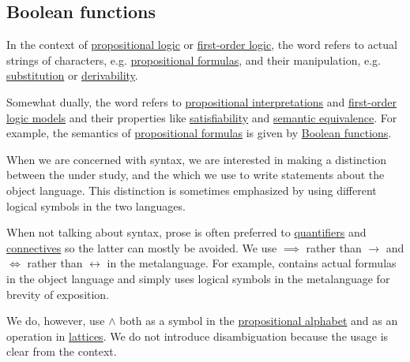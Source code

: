 \subsection{Boolean functions}\label{subsec:boolean_functions}

\begin{remark}\label{rem:metalanguage_syntax_and_semantics}
  In the context of \hyperref[subsec:propositional_logic]{propositional logic} or \hyperref[subsec:first_order_logic]{first-order logic}, the word  refers to actual strings of characters, e.g. \hyperref[def:propositional_syntax]{propositional formulas}, and their manipulation, e.g. \hyperref[def:propositional_substitution]{substitution} or \hyperref[def:first_order_proofs/derivability]{derivability}.

  Somewhat dually, the word  refers to \hyperref[def:propositional_valuation/interpretation]{propositional interpretations} and \hyperref[def:first_order_semantics/satisfiability]{first-order logic models} and their properties like \hyperref[def:propositional_semantics/satisfiability]{satisfiability} and \hyperref[def:propositional_semantics/equivalence]{semantic equivalence}. For example, the semantics of \hyperref[def:propositional_syntax]{propositional formulas} is given by \hyperref[def:boolean_function]{Boolean functions}.

  When we are concerned with syntax, we are interested in making a distinction between the  under study, and the  which we use to write statements about the object language. This distinction is sometimes emphasized by using different logical symbols in the two languages.

  When not talking about syntax, prose is often preferred to \hyperref[def:first_order_language/quantifiers]{quantifiers} and \hyperref[def:propositional_language/connectives]{connectives} so the latter can mostly be avoided. We use \( \implies \) rather than \( \to \) and \( \iff \) rather than \( \leftrightarrow \) in the metalanguage. For example,  contains actual formulas in the object language and  simply uses logical symbols in the metalanguage for brevity of exposition.

  We do, however, use \( \wedge \) both as a symbol in the \hyperref[def:propositional_language]{propositional alphabet} and as an operation in \hyperref[def:binary_lattice_operations/meet]{lattices}. We do not introduce disambiguation because the usage is clear from the context.


\end{remark}

